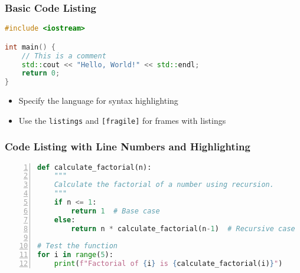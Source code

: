 \documentclass[aspectratio=169,professionalfonts]{beamer}
\begin{document}
\begin{frame}[fragile]
    \frametitle{Basic Code Listing}
    
    \begin{lstlisting}[language=C++, caption=Hello World Example]
#include <iostream>

int main() {
    // This is a comment
    std::cout << "Hello, World!" << std::endl;
    return 0;
}
    \end{lstlisting}
    
    \begin{tcolorbox}[colback=ugmLightGrey,colframe=ugmBlue,title=Listing Tip]
        \begin{itemize}
            \item Specify the language for syntax highlighting
            \item Use the \texttt{listings} and \texttt{[fragile]} for frames with listings
        \end{itemize}
    \end{tcolorbox}
\end{frame}

\begin{frame}[fragile]
    \frametitle{Code Listing with Line Numbers and Highlighting}
    
    \begin{lstlisting}[language=Python, 
                      caption=Python Example, 
                      numbers=left,
                      numberstyle=\tiny\color{codegray},
                      keywordstyle=\color{ugmBlue},
                      commentstyle=\color{codegreen},
                      stringstyle=\color{codepurple},
                      basicstyle=\ttfamily\footnotesize,
                      breaklines=true]
def calculate_factorial(n):
    """
    Calculate the factorial of a number using recursion.
    """
    if n <= 1:
        return 1  # Base case
    else:
        return n * calculate_factorial(n-1)  # Recursive case

# Test the function
for i in range(5):
    print(f"Factorial of {i} is {calculate_factorial(i)}")
    \end{lstlisting}
\end{frame}
\end{document}
